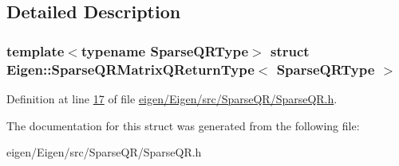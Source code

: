 \subsection{Detailed Description}
\subsubsection*{template$<$typename Sparse\+Q\+R\+Type$>$\newline
struct Eigen\+::\+Sparse\+Q\+R\+Matrix\+Q\+Return\+Type$<$ Sparse\+Q\+R\+Type $>$}



Definition at line \hyperlink{eigen_2_eigen_2src_2_sparse_q_r_2_sparse_q_r_8h_source_l00017}{17} of file \hyperlink{eigen_2_eigen_2src_2_sparse_q_r_2_sparse_q_r_8h_source}{eigen/\+Eigen/src/\+Sparse\+Q\+R/\+Sparse\+Q\+R.\+h}.



The documentation for this struct was generated from the following file\+:\begin{DoxyCompactItemize}
\item 
eigen/\+Eigen/src/\+Sparse\+Q\+R/\+Sparse\+Q\+R.\+h\end{DoxyCompactItemize}
